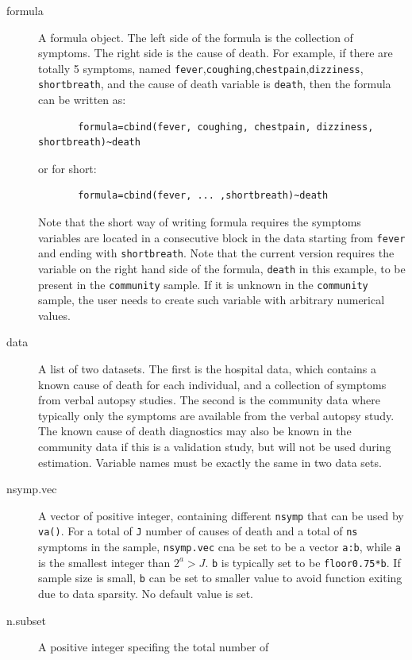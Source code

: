 \documentclass[oneside,letterpaper,titlepage]{article}
\begin{document}
\begin{description}
\item[formula] A formula object. The left side of the formula is the
  collection of symptoms. The right side is the cause of death.  For
  example, if there are totally 5 symptoms, named
  \texttt{fever},\texttt{coughing},\texttt{chestpain},\texttt{dizziness},
  \texttt{shortbreath}, and the cause of death variable is
  \texttt{death}, then the formula can be written as:

    \begin{verbatim}
       formula=cbind(fever, coughing, chestpain, dizziness, shortbreath)~death
    \end{verbatim}
  or for short:
    \begin{verbatim}
       formula=cbind(fever, ... ,shortbreath)~death
       \end{verbatim}
  Note that the short way of writing formula requires the symptoms
  variables are located in a consecutive block in the data starting
  from \texttt{fever} and ending with \texttt{shortbreath}.
Note that the current version requires the variable on the right hand
   side of the formula, \texttt{death} in this example, to be present in
   the \texttt{community} sample. If it is unknown in the
   \texttt{community} sample, the user needs to create such variable
   with arbitrary numerical values.
\item[data] A list of two datasets. The first is the hospital data,
  which contains a known cause of death for each individual, and a
  collection of symptoms from verbal autopsy studies.  The second is
  the community data where typically only the symptoms are available
  from the verbal autopsy study. The known cause of death diagnostics
  may also be known in the community data if this is a validation
  study, but will not be used during estimation.  Variable names must
  be exactly the same in two data sets.
\item[nsymp.vec] A vector of positive integer, containing different
  \texttt{nsymp} that can be used by \texttt{va()}.  For a total of
  \texttt{J} number of causes of death and a total of \texttt{ns} symptoms
  in the sample, \texttt{nsymp.vec} cna be set to be a vector
  \texttt{a:b}, while \texttt{a} is the smallest integer than $2^a>J$.
  \texttt{b} is typically set to be \texttt{floor{0.75*b}}. If sample
  size is small, \texttt{b} can be set to smaller value to avoid
  function exiting due to data sparsity.  No default value is set.
  \item[n.subset] A positive integer specifing the total number of

\end{description}
\end{document}
